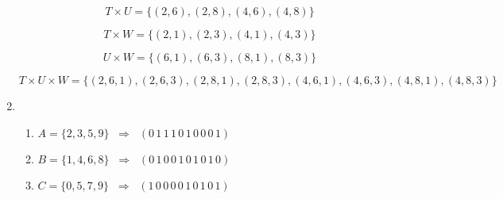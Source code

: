 \documentclass{article}
\begin{document}
\begin{enumerate}
\[
T \times U = \{(2,6), (2,8), (4,6), (4,8)\}
\]

\[
T \times W = \{(2,1), (2,3), (4,1), (4,3)\}
\]

\[
U \times W = \{(6,1), (6,3), (8,1), (8,3)\}
\]

\[
T \times U \times W =
\{(2,6,1), (2,6,3), (2,8,1), (2,8,3),
  (4,6,1), (4,6,3), (4,8,1), (4,8,3)\}
\]

	\item 
\begin{enumerate}
    \item $A = \{2, 3, 5, 9\} \;\;\Rightarrow\;\; (0\,1\,1\,1\,0\,1\,0\,0\,0\,1)$
    \item $B = \{1, 4, 6, 8\} \;\;\Rightarrow\;\; (0\,1\,0\,0\,1\,0\,1\,0\,1\,0)$
    \item $C = \{0, 5, 7, 9\} \;\;\Rightarrow\;\; (1\,0\,0\,0\,0\,1\,0\,1\,0\,1)$
\end{enumerate}
\end{enumerate}
\end{document}
